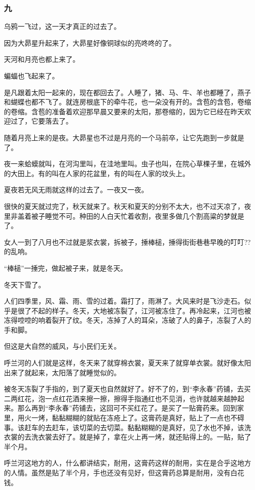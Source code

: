 \subsubsection*{九}
\par 乌鸦一飞过，这一天才真正的过去了。
\par 因为大昴星升起来了，大昴星好像铜球似的亮咚咚的了。
\par 天河和月亮也都上来了。
\par 蝙蝠也飞起来了。
\par 是凡跟着太阳一起来的，现在都回去了。人睡了，猪、马、牛、羊也都睡了，燕子和蝴蝶也都不飞了。就连房根底下的牵牛花，也一朵没有开的。含苞的含苞，卷缩的卷缩。含苞的准备着欢迎那早晨又要来的太阳，那卷缩的，因为它已经在昨天欢迎过了，它要落去了。
\par 随着月亮上来的是夜。大昴星也不过是月亮的一个马前卒，让它先跑到一步就是了。
\par 夜一来蛤蟆就叫，在河沟里叫，在洼地里叫。虫子也叫，在院心草棵子里，在城外的大田上。有的叫在人家的花盆里，有的叫在人家的坟头上。
\par 夏夜若无风无雨就这样的过去了。一夜又一夜。
\par 很快的夏天就过完了，秋天就来了。秋天和夏天的分别不太大，也不过天凉了，夜里非盖着被子睡觉不可。种田的人白天忙着收割，夜里多做几个割高粱的梦就是了。
\par 女人一到了八月也不过就是浆衣裳，拆被子，捶棒槌，捶得街街巷巷早晚的叮叮??的乱响。
\par “棒槌”一捶完，做起被子来，就是冬天。
\par 冬天下雪了。
\par 人们四季里，风、霜、雨、雪的过着。霜打了，雨淋了。大风来时是飞沙走石。似乎是很了不起的样子。冬天，大地被冻裂了，江河被冻住了。再冷起来，江河也被冻得啌啌的响着裂开了纹。冬天，冻掉了人的耳朵，冻破了人的鼻子，冻裂了人的手和脚。
\par 但这是大自然的威风，与小民们无关。
\par 呼兰河的人们就是这样，冬天来了就穿棉衣裳，夏天来了就穿单衣裳。就好像太阳出来了就起来，太阳落了就睡觉似的。
\par 被冬天冻裂了手指的，到了夏天也自然就好了。好不了的，到“李永春”药铺，去买二两红花，泡一点红花酒来擦一擦，擦得手指通红也不见消，也许就越来越肿起来。那么再到“李永春”药铺去，这回可不买红花了。是买了一贴膏药来。回到家里，用火一烤，黏黏糊糊的就贴在冻疮上了。这膏药是真好，贴上了一点也不碍事。该赶车的去赶车，该切菜的去切菜。黏黏糊糊的是真好，见了水也不掉，该洗衣裳的去洗衣裳去好了。就是掉了，拿在火上再一烤，就还贴得上的。一贴，贴了半个月。
\par 呼兰河这地方的人，什么都讲结实，耐用，这膏药这样的耐用，实在是合乎这地方的人情。虽然是贴了半个月，手也还没有见好，但这膏药总算是耐用，没有白花钱。
